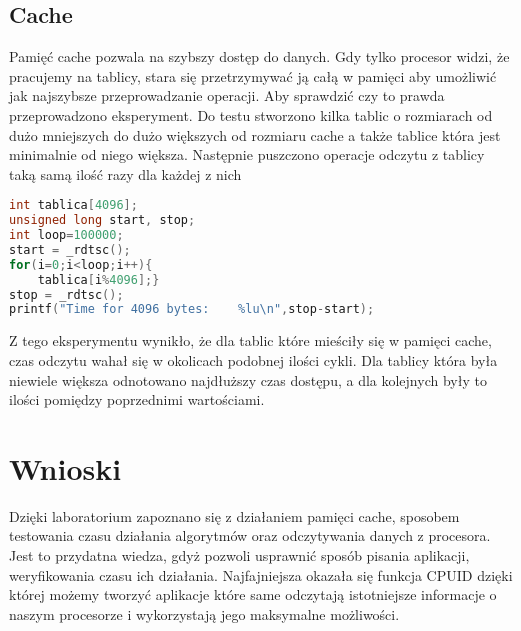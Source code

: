 \subsection{Cache}
Pamięć cache pozwala na szybszy dostęp do danych. Gdy tylko procesor widzi, że pracujemy na tablicy, stara się przetrzymywać ją całą w pamięci aby umożliwić jak najszybsze przeprowadzanie operacji. Aby sprawdzić czy to prawda przeprowadzono eksperyment. Do testu stworzono kilka tablic o rozmiarach od dużo mniejszych do dużo większych od rozmiaru cache a także tablice która jest minimalnie od niego większa. Następnie puszczono operacje odczytu z tablicy taką samą ilość razy dla każdej z nich
\begin{lstlisting}[language=C, frame=single, caption=Przykładowa funkcja obliczająca ilość cykli dla odczytu danych z tablicy 4096 intów, label=l:vertical, basicstyle=\small]  
int tablica[4096];
unsigned long start, stop;
int loop=100000;
start = _rdtsc();
for(i=0;i<loop;i++){
	tablica[i%4096];}	
stop = _rdtsc();
printf("Time for 4096 bytes:	%lu\n",stop-start);
\end{lstlisting}
Z tego eksperymentu wynikło, że dla tablic które mieściły się w pamięci cache, czas odczytu wahał się w okolicach podobnej ilości cykli. Dla tablicy która była niewiele większa odnotowano najdłuższy czas dostępu, a dla kolejnych były to ilości pomiędzy poprzednimi wartościami.

\section{Wnioski}
Dzięki laboratorium zapoznano się z działaniem pamięci cache, sposobem testowania czasu działania algorytmów oraz odczytywania danych z procesora. Jest to przydatna wiedza, gdyż pozwoli usprawnić sposób pisania aplikacji, weryfikowania czasu ich działania. Najfajniejsza okazała się funkcja CPUID dzięki której możemy tworzyć aplikacje które same odczytają istotniejsze informacje o naszym procesorze i wykorzystają jego maksymalne możliwości.